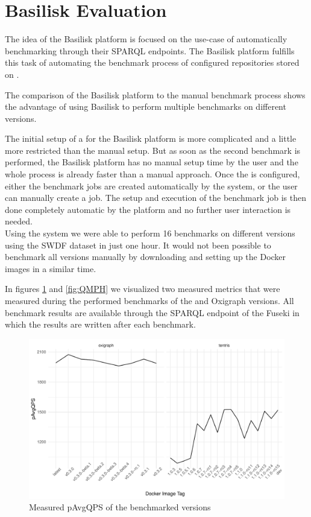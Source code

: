 \section{Basilisk Evaluation}
The idea of the Basilisk platform is focused on the use-case of automatically benchmarking \tsp{} through their SPARQL endpoints.
The Basilisk platform fulfills this task of automating the benchmark process of configured \ts{} repositories stored on \dockh{}.

The comparison of the Basilisk platform to the manual benchmark process shows the advantage of using Basilisk to perform multiple benchmarks on different \ts{} versions.

The initial setup of a \ts{} for the Basilisk platform is more complicated and a little more restricted than the manual setup.
But as soon as the second benchmark is performed, the Basilisk platform has no manual setup time by the user and the whole process is already faster than a manual approach.
Once the \ts{} is configured, either the benchmark jobs are created automatically by the system, or the user can manually create a job.
The setup and execution of the benchmark job is then done completely automatic by the platform and no further user interaction is needed.
\\

Using the system we were able to perform 16 benchmarks on different \tentris{} versions using the SWDF dataset in just one hour.
It would not been possible to benchmark all versions manually by downloading and setting up the Docker images in a similar time.

In figures \ref{fig:pAvgQPS} and \ref{fig:QMPH} we visualized two measured metrics that were measured during the performed benchmarks of the \tentris{} and Oxigraph versions.
All benchmark results are available through the SPARQL endpoint of the Fuseki \ts{} in which the results are written after each benchmark.

\begin{figure}[tbph]
	\centering
	\includegraphics[width=.8\textwidth]{figures/pAvgQPS.pdf}
	\caption{Measured pAvgQPS of the benchmarked \ts{} versions}
	\label{fig:pAvgQPS}
\end{figure}

